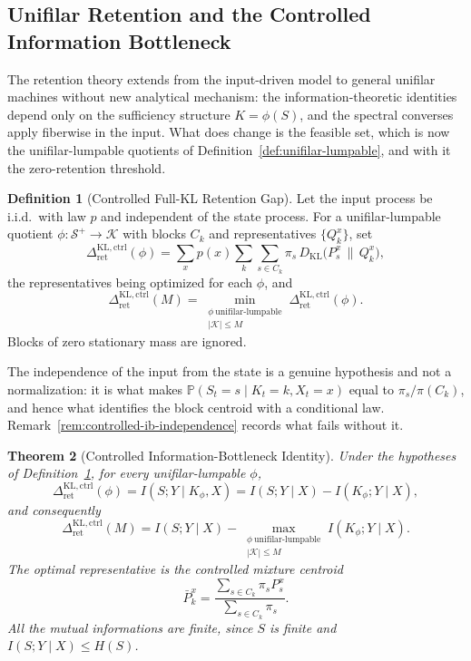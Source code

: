 \documentclass[12pt]{article}
\newtheorem{theorem}{Theorem}[section]
\theoremstyle{definition}
\newtheorem{definition}[theorem]{Definition}
\newcommand{\Splus}{\mathcal S^{+}}
\newcommand{\RetKLc}{\Delta_{\mathrm{ret}}^{\mathrm{KL,ctrl}}}
\begin{document}
\subsection{Unifilar Retention and the Controlled Information Bottleneck}
\label{subsec:unifilar-retention}

The retention theory extends from the input-driven model to general unifilar
machines without new analytical mechanism: the information-theoretic identities
depend only on the sufficiency structure $K=\phi(S)$, and the spectral
converses apply fiberwise in the input.  What does change is the feasible set,
which is now the unifilar-lumpable quotients of
Definition~\ref{def:unifilar-lumpable}, and with it the zero-retention
threshold.

\begin{definition}[Controlled Full-KL Retention Gap]
\label{def:controlled-full-kl}
Let the input process be i.i.d.\ with law $p$ and independent of the state
process.  For a unifilar-lumpable quotient $\phi:\Splus\to\mathcal K$ with
blocks $C_k$ and representatives $\{Q_k^x\}$, set
\[
\RetKLc(\phi)
=
\sum_xp(x)\sum_k\sum_{s\in C_k}\pi_s\,
D_{\mathrm{KL}}\bigl(P_s^x\,\big\|\,Q_k^x\bigr),
\]
the representatives being optimized for each $\phi$, and
\[
\RetKLc(M)
=
\min_{\substack{\phi\ \text{unifilar-lumpable}\\ |\mathcal K|\le M}}
\RetKLc(\phi).
\]
Blocks of zero stationary mass are ignored.
\end{definition}

The independence of the input from the state is a genuine hypothesis and not a
normalization: it is what makes $\mathbb P(S_t=s\mid K_t=k,X_t=x)$ equal to
$\pi_s/\pi(C_k)$, and hence what identifies the block centroid with a
conditional law.  Remark~\ref{rem:controlled-ib-independence} records what
fails without it.

\begin{theorem}[Controlled Information-Bottleneck Identity]
\label{thm:controlled-ib}
Under the hypotheses of Definition~\ref{def:controlled-full-kl}, for every
unifilar-lumpable $\phi$,
\[
\RetKLc(\phi)
=
I(S;Y\mid K_\phi,X)
=
I(S;Y\mid X)-I(K_\phi;Y\mid X),
\]
and consequently
\[
\RetKLc(M)
=
I(S;Y\mid X)
-
\max_{\substack{\phi\ \text{unifilar-lumpable}\\|\mathcal K|\le M}}
I(K_\phi;Y\mid X).
\]
The optimal representative is the controlled mixture centroid
\[
\bar P_k^x
=
\frac{\sum_{s\in C_k}\pi_sP_s^x}{\sum_{s\in C_k}\pi_s}.
\]
All the mutual informations are finite, since $S$ is finite and
$I(S;Y\mid X)\le H(S)$.
\end{theorem}
\end{document}
